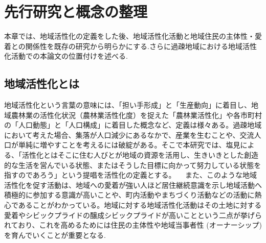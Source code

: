 \documentclass[a4paper]{jsarticle}
\begin{document}
\newpage

\section{先行研究と概念の整理}
本章では、地域活性化の定義をした後、地域活性化活動と地域住民の主体性・愛着との関係性を既存の研究から明らかにする.さらに過疎地域における地域活性化活動での本論文の位置付けを述べる.
\subsection{地域活性化とは}
地域活性化という言葉の意味には、「担い手形成」と「生産動向」に着目し、地域農林業の活性化状況（農林業活性化度）を捉えた「農林業活性化」や各市町村の「人口動態」と「人口構成」に着目した概念など、定義は様々ある。過疎地域において考えた場合、集落が人口減少にあるなかで、産業を生むことや、交流人口が単純に増やすことを考えるには破綻がある。そこで本研究では、塩見による、「活性化とはそこに住む人びとが地域の資源を活用し、生きいきとした創造的な生活を営んでいる状態、またはそうした目標に向かって努力している状態を指すのであろう」という提唱を活性化の定義とする。
　また、このような地域活性化を促す活動は、地域への愛着が強い人ほど居住継続意識を示し地域活動へ積極的に参加する意識が高いことや、町内活動やまちづくり活動などの活動に熱心であること\cite{8}がわかっている。地域に対する地域活性化活動はその土地に対する愛着やシビックプライドの醸成シビックプライドが高いことという二点が挙げられており、これを高めるためには住民の主体性や地域当事者性 (オーナーシップ) を育んでいくことが重要となる.
\end{document}
